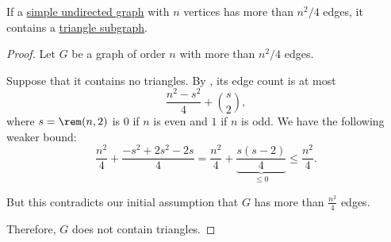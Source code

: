 \begin{theorem}\label{thm:mantels_theorem}
  If a \hyperref[def:undirected_graph]{simple undirected graph} with \( n \) vertices has more than \( n^2 / 4 \) edges, it contains a \hyperref[def:triangle_graph]{triangle subgraph}.
\end{theorem}
\begin{proof}
  Let \( G \) be a graph of order \( n \) with more than \( n^2 / 4 \) edges.

  Suppose that it contains no triangles. By , its edge count is at most
  \begin{equation*}
    \frac {n^2 - s^2} 4 + \binom s 2,
  \end{equation*}
  where \( s = \rem(n, 2) \) is \( 0 \) if \( n \) is even and \( 1 \) if \( n \) is odd. We have the following weaker bound:
  \begin{equation*}
    \frac {n^2} 4 + \frac {-s^2 + 2s^2 - 2s} 4
    =
    \frac {n^2} 4 + \underbrace{\frac {s(s - 2)} 4}_{\leq 0}
    \leq
    \frac {n^2} 4.
  \end{equation*}

  But this contradicts our initial assumption that \( G \) has more than \( \frac {n^2} 4 \) edges.

  Therefore, \( G \) does not contain triangles.
\end{proof}
